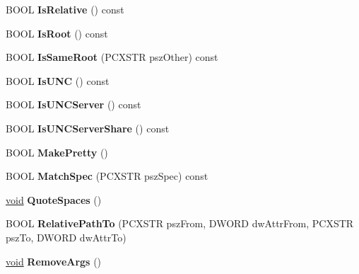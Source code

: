 \begin{DoxyCompactItemize}
B\+O\+OL {\bfseries Is\+Relative} () const
\item 
\mbox{\label{class_a_t_l_1_1_c_path_t_a08664c71740c7ca1954ffcad4f02df4f}} 
B\+O\+OL {\bfseries Is\+Root} () const
\item 
\mbox{\label{class_a_t_l_1_1_c_path_t_aeeaa4830df4f7f1dba346827a7e6bd97}} 
B\+O\+OL {\bfseries Is\+Same\+Root} (P\+C\+X\+S\+TR psz\+Other) const
\item 
\mbox{\label{class_a_t_l_1_1_c_path_t_ac21fd22024b5033879e51930466e2dc1}} 
B\+O\+OL {\bfseries Is\+U\+NC} () const
\item 
\mbox{\label{class_a_t_l_1_1_c_path_t_a8585849b7c306969d12095c1c212a2c8}} 
B\+O\+OL {\bfseries Is\+U\+N\+C\+Server} () const
\item 
\mbox{\label{class_a_t_l_1_1_c_path_t_a1deaffcb7cec255c86a24bf2b7576580}} 
B\+O\+OL {\bfseries Is\+U\+N\+C\+Server\+Share} () const
\item 
\mbox{\label{class_a_t_l_1_1_c_path_t_a6027b8df10f11708dd012a655bf11482}} 
B\+O\+OL {\bfseries Make\+Pretty} ()
\item 
\mbox{\label{class_a_t_l_1_1_c_path_t_a8624b94d35715d42937c52894facf008}} 
B\+O\+OL {\bfseries Match\+Spec} (P\+C\+X\+S\+TR psz\+Spec) const
\item 
\mbox{\label{class_a_t_l_1_1_c_path_t_a4e576dd8f23ad8ced70f93c8f3298bd2}} 
\hyperlink{interfacevoid}{void} {\bfseries Quote\+Spaces} ()
\item 
\mbox{\label{class_a_t_l_1_1_c_path_t_ac97454856d520c10f4fa0b5c025b141b}} 
B\+O\+OL {\bfseries Relative\+Path\+To} (P\+C\+X\+S\+TR psz\+From, D\+W\+O\+RD dw\+Attr\+From, P\+C\+X\+S\+TR psz\+To, D\+W\+O\+RD dw\+Attr\+To)
\item 
\mbox{\label{class_a_t_l_1_1_c_path_t_a7ba1616cbb4444a42ac1bbd46a1dc553}} 
\hyperlink{interfacevoid}{void} {\bfseries Remove\+Args} ()

\end{DoxyCompactItemize}
